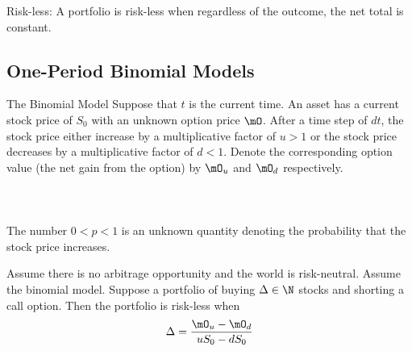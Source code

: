 \documentclass[a4paper]{article}
\begin{document}
Risk-less: A portfolio is risk-less when regardless of the outcome, the net total is constant. 

\subsection{One-Period Binomial Models}
\begin{defn}{The Binomial Model}{} Suppose that $t$ is the current time. An asset has a current stock price of $S_0$ with an unknown option price $\mO$. After a time step of $dt$, the stock price either increase by a multiplicative factor of $u>1$ or the stock price decreases by a multiplicative factor of $d<1$. Denote the corresponding option value (the net gain from the option) by $\mO_u$ and $\mO_d$ respectively. \\~\\
 \\~\\
The number $0<p<1$ is an unknown quantity denoting the probability that the stock price increases. 
\end{defn}

\begin{lmm}{}{} Assume there is no arbitrage opportunity and the world is risk-neutral. Assume the binomial model. Suppose a portfolio of buying $\Delta\in\N$ stocks and shorting a call option. Then the portfolio is risk-less when $$\Delta=\frac{\mO_u-\mO_d}{uS_0-dS_0}$$
\end{lmm}
\end{document}

